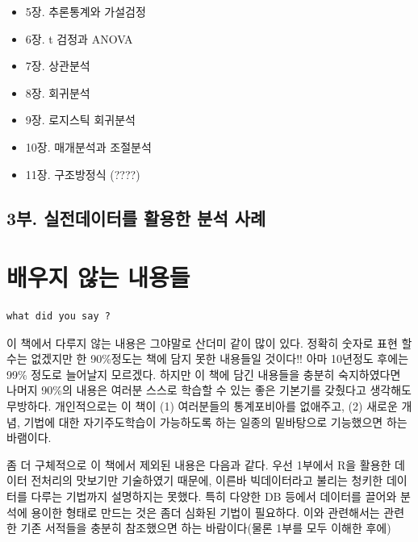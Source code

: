 \documentclass[
]{book}
\providecommand{\tightlist}{%
  \setlength{\itemsep}{0pt}\setlength{\parskip}{0pt}}
\theoremstyle{definition}
\theoremstyle{definition}
\theoremstyle{definition}
\theoremstyle{definition}
\theoremstyle{remark}
\begin{document}
\begin{itemize}
\tightlist
\item
  5장. 추론통계와 가설검정
\item
  6장. t 검정과 ANOVA
\item
  7장. 상관분석
\item
  8장. 회귀분석
\item
  9장. 로지스틱 회귀분석
\item
  10장. 매개분석과 조절분석
\item
  11장. 구조방정식 (????)
\end{itemize}

\hypertarget{uxbd80.-uxc2e4uxc804uxb370uxc774uxd130uxb97c-uxd65cuxc6a9uxd55c-uxbd84uxc11d-uxc0acuxb840}{%
\subsection*{3부. 실전데이터를 활용한 분석 사례}\label{uxbd80.-uxc2e4uxc804uxb370uxc774uxd130uxb97c-uxd65cuxc6a9uxd55c-uxbd84uxc11d-uxc0acuxb840}}

\hypertarget{uxbc30uxc6b0uxc9c0-uxc54auxb294-uxb0b4uxc6a9uxb4e4}{%
\section{배우지 않는 내용들}\label{uxbc30uxc6b0uxc9c0-uxc54auxb294-uxb0b4uxc6a9uxb4e4}}

\begin{verbatim}
what did you say ?    
\end{verbatim}

이 책에서 다루지 않는 내용은 그야말로 산더미 같이 많이 있다. 정확히 숫자로 표현 할수는 없겠지만 한 90\%정도는 책에 담지 못한 내용들일 것이다!! 아마 10년정도 후에는 99\% 정도로 늘어날지 모르겠다. 하지만 이 책에 담긴 내용들을 충분히 숙지하였다면 나머지 90\%의 내용은 여러분 스스로 학습할 수 있는 좋은 기본기를 갖췄다고 생각해도 무방하다. 개인적으로는 이 책이 (1) 여러분들의 통계포비아를 없애주고, (2) 새로운 개념, 기법에 대한 자기주도학습이 가능하도록 하는 일종의 밑바탕으로 기능했으면 하는 바램이다.

좀 더 구체적으로 이 책에서 제외된 내용은 다음과 같다. 우선 1부에서 R을 활용한 데이터 전처리의 맛보기만 기술하였기 때문에, 이른바 빅데이터라고 불리는 청키한 데이터를 다루는 기법까지 설명하지는 못했다. 특히 다양한 DB 등에서 데이터를 끌어와 분석에 용이한 형태로 만드는 것은 좀더 심화된 기법이 필요하다. 이와 관련해서는 관련한 기존 서적들을 충분히 참조했으면 하는 바람이다(물론 1부를 모두 이해한 후에)
\end{document}
